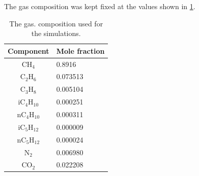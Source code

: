 The gas composition was kept fixed at the values shown in \cref{tab:composition}.
\begin{table}[!hb]
    \caption{
        The gas.  composition used for the simulations.
        \label{tab:composition}
    }
    \centering
    \begin{tabular}{cl}
        \toprule
        Component & {Mole fraction} \\ %
        \midrule
        CH$_4$ & 0.8916 \\
        C$_2$H$_6$ & 0.073513 \\
        C$_3$H$_8$ & 0.005104 \\
        iC$_4$H$_{10}$ & 0.000251 \\
        nC$_4$H$_{10}$ & 0.000311 \\
        iC$_5$H$_{12}$ & 0.000009 \\
        nC$_5$H$_{12}$ & 0.000024 \\
        N$_2$ & 0.006980 \\
        CO$_2$ & 0.022208 \\
        \bottomrule
    \end{tabular}
\end{table}
%
